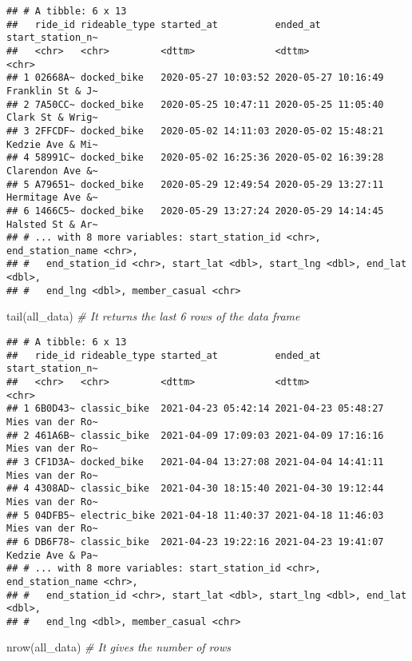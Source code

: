 \documentclass[
]{article}
\newenvironment{Shaded}{\begin{snugshade}}{\end{snugshade}}
\newcommand{\CommentTok}[1]{\textcolor[rgb]{0.56,0.35,0.01}{\textit{#1}}}
\newcommand{\FunctionTok}[1]{\textcolor[rgb]{0.00,0.00,0.00}{#1}}
\newcommand{\NormalTok}[1]{#1}
\begin{document}
\begin{verbatim}
## # A tibble: 6 x 13
##   ride_id rideable_type started_at          ended_at            start_station_n~
##   <chr>   <chr>         <dttm>              <dttm>              <chr>           
## 1 02668A~ docked_bike   2020-05-27 10:03:52 2020-05-27 10:16:49 Franklin St & J~
## 2 7A50CC~ docked_bike   2020-05-25 10:47:11 2020-05-25 11:05:40 Clark St & Wrig~
## 3 2FFCDF~ docked_bike   2020-05-02 14:11:03 2020-05-02 15:48:21 Kedzie Ave & Mi~
## 4 58991C~ docked_bike   2020-05-02 16:25:36 2020-05-02 16:39:28 Clarendon Ave &~
## 5 A79651~ docked_bike   2020-05-29 12:49:54 2020-05-29 13:27:11 Hermitage Ave &~
## 6 1466C5~ docked_bike   2020-05-29 13:27:24 2020-05-29 14:14:45 Halsted St & Ar~
## # ... with 8 more variables: start_station_id <chr>, end_station_name <chr>,
## #   end_station_id <chr>, start_lat <dbl>, start_lng <dbl>, end_lat <dbl>,
## #   end_lng <dbl>, member_casual <chr>
\end{verbatim}

\begin{Shaded}
\begin{Highlighting}[]
 \FunctionTok{tail}\NormalTok{(all\_data) }\CommentTok{\# It returns the last 6  rows of the data frame}
\end{Highlighting}
\end{Shaded}

\begin{verbatim}
## # A tibble: 6 x 13
##   ride_id rideable_type started_at          ended_at            start_station_n~
##   <chr>   <chr>         <dttm>              <dttm>              <chr>           
## 1 6B0D43~ classic_bike  2021-04-23 05:42:14 2021-04-23 05:48:27 Mies van der Ro~
## 2 461A6B~ classic_bike  2021-04-09 17:09:03 2021-04-09 17:16:16 Mies van der Ro~
## 3 CF1D3A~ docked_bike   2021-04-04 13:27:08 2021-04-04 14:41:11 Mies van der Ro~
## 4 4308AD~ classic_bike  2021-04-30 18:15:40 2021-04-30 19:12:44 Mies van der Ro~
## 5 04DFB5~ electric_bike 2021-04-18 11:40:37 2021-04-18 11:46:03 Mies van der Ro~
## 6 DB6F78~ classic_bike  2021-04-23 19:22:16 2021-04-23 19:41:07 Kedzie Ave & Pa~
## # ... with 8 more variables: start_station_id <chr>, end_station_name <chr>,
## #   end_station_id <chr>, start_lat <dbl>, start_lng <dbl>, end_lat <dbl>,
## #   end_lng <dbl>, member_casual <chr>
\end{verbatim}

\begin{Shaded}
\begin{Highlighting}[]
 \FunctionTok{nrow}\NormalTok{(all\_data) }\CommentTok{\# It gives the number of rows}
\end{Highlighting}
\end{Shaded}
\end{document}
